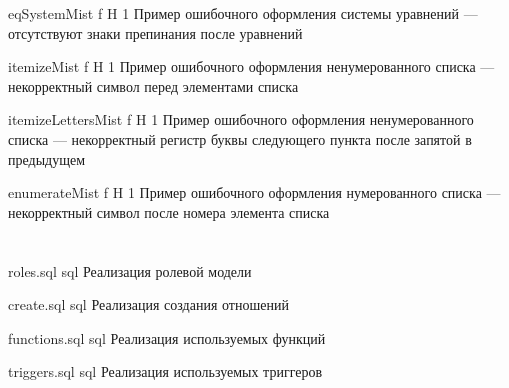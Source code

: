 \begin{appendices}
	{eqSystemMist} %
	{f} %
	{H} %
	{1\textwidth} %
	{Пример ошибочного оформления системы уравнений --- отсутствуют знаки препинания после уравнений} %
	
	{itemizeMist} %
	{f} %
	{H} %
	{1\textwidth} %
	{Пример ошибочного оформления ненумерованного списка --- некорректный символ перед элементами списка} %
	
	{itemizeLettersMist} %
	{f} %
	{H} %
	{1\textwidth} %
	{Пример ошибочного оформления ненумерованного списка --- некорректный регистр буквы следующего пункта после запятой в предыдущем} %
	
	{enumerateMist} %
	{f} %
	{H} %
	{1\textwidth} %
	{Пример ошибочного оформления нумерованного списка --- некорректный символ после номера элемента списка} %
	
	
	\chapter{}
	{roles.sql} %
	{sql} %
	{Реализация ролевой модели} %
	
	{create.sql} %
	{sql} %
	{Реализация создания отношений} %
	
	{functions.sql} %
	{sql} %
	{Реализация используемых функций} %
	
	{triggers.sql} %
	{sql} %
	{Реализация используемых триггеров} %
	
	
	
	
	
\end{appendices}
	
	

